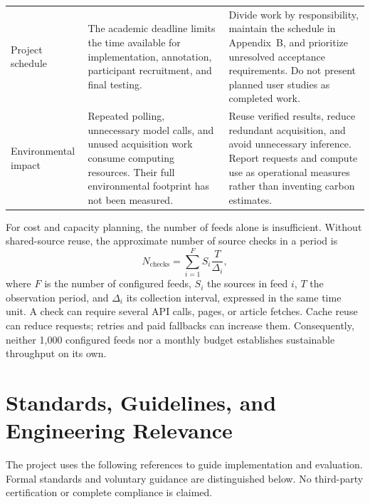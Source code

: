 \begin{longtable}{L{2.6cm}L{4.8cm}L{\dimexpr\linewidth-7.4cm-6\tabcolsep\relax}}
Project schedule & The academic deadline limits the time available for implementation, annotation, participant recruitment, and final testing.
& Divide work by responsibility, maintain the schedule in Appendix~B, and prioritize unresolved acceptance requirements. Do not present planned user studies as completed work. \\
Environmental impact & Repeated polling, unnecessary model calls, and unused acquisition work consume computing resources. Their full environmental footprint has not been measured.
& Reuse verified results, reduce redundant acquisition, and avoid unnecessary inference. Report requests and compute use as operational measures rather than inventing carbon estimates. \\
\end{longtable}
\endgroup

For cost and capacity planning, the number of feeds alone is insufficient. Without shared-source reuse, the approximate number of source checks in a period is
\begin{equation}
N_{\mathrm{checks}} = \sum_{i=1}^{F} S_i\frac{T}{\Delta_i},
\end{equation}
where $F$ is the number of configured feeds, $S_i$ the sources in feed $i$, $T$ the observation period, and $\Delta_i$ its collection interval, expressed in the same time unit. A check can require several API calls, pages, or article fetches. Cache reuse can reduce requests; retries and paid fallbacks can increase them. Consequently, neither 1,000 configured feeds nor a monthly budget establishes sustainable throughput on its own.

\section{Standards, Guidelines, and Engineering Relevance}

The project uses the following references to guide implementation and evaluation. Formal standards and voluntary guidance are distinguished below. No third-party certification or complete compliance is claimed.

